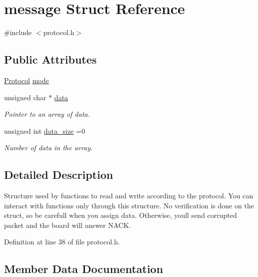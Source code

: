 \hypertarget{structmessage}{}\section{message Struct Reference}
\label{structmessage}


{\ttfamily \#include $<$protocol.\+h$>$}

\subsection*{Public Attributes}
\begin{DoxyCompactItemize}
\item 
\hyperlink{protocol_8h_ad327bde01da3f3f8f71ae03db02572bc}{Protocol} \hyperlink{structmessage_a09bed901f53052cc020ab6ec8d64e3ee}{mode}
\item 
unsigned char $\ast$ \hyperlink{structmessage_a56cfb15f3cbc41b9b8e5e0ba34d6bea4}{data}
\begin{DoxyCompactList}\small\item\em Pointer to an array of data. \end{DoxyCompactList}\item 
unsigned int \hyperlink{structmessage_a3a17f9f2aa68b473300ae38d4bad06e8}{data\+\_\+size} =0
\begin{DoxyCompactList}\small\item\em Number of data in the array. \end{DoxyCompactList}\end{DoxyCompactItemize}


\subsection{Detailed Description}
Structure used by functions to read and write according to the protocol. You can interact with functions only through this structure. No verification is done on the struct, so be carefull when you assign data. Otherwise, you\textquotesingle{}ll send corrupted packet and the board will answer N\+A\+C\+K. 

Definition at line 38 of file protocol.\+h.



\subsection{Member Data Documentation}
\hypertarget{structmessage_a56cfb15f3cbc41b9b8e5e0ba34d6bea4}{}
